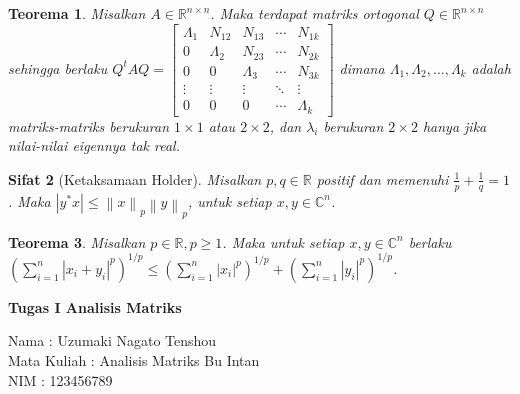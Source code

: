 \documentclass[11pt,a4paper]{article}
\newcommand{\ds}{\displaystyle}
\theoremstyle{plain}
\newtheorem{theorem}{Teorema}[section]
\newtheorem{sifat}[theorem]{Sifat}
\theoremstyle{definition}
\theoremstyle{remark}
\begin{document}
\begin{enumerate}
	\begin{bfseries}
		\begin{theorem}
			Misalkan $A\in \mathbb{R}^{n\times n}$. Maka terdapat matriks ortogonal $Q\in \mathbb{R}^{n\times n}$ sehingga berlaku $Q^{t}AQ = \begin{bmatrix}
			\Lambda_{1} & N_{12} & N_{13} & \cdots & N_{1k} \\
			0 & \Lambda_{2} & N_{23} & \cdots & N_{2k} \\
			0 & 0 & \Lambda_{3} & \cdots & N_{3k} \\
			\vdots & \vdots & \vdots &\ddots & \vdots \\
			0 & 0 & 0 & \cdots & \Lambda_{k}	
			\end{bmatrix}$ dimana $\Lambda_{1},\Lambda_{2},\ldots,\Lambda_{k}$ adalah matriks-matriks berukuran $1\times 1$ atau $2\times 2$, dan $\lambda_{i}$ berukuran $2\times 2$ hanya jika nilai-nilai eigennya tak real.
		\end{theorem}
	\end{bfseries}

	\begin{bfseries}
		\begin{sifat}[Ketaksamaan Holder]
			Misalkan $p,q\in \mathbb{R}$ positif dan memenuhi $\ds \frac{1}{p}+\frac{1}{q}=1$. Maka $\left| y^{\ast}x \right|\leq \left\| x \right\|_{p} \left\| y\right\|_{p}$, untuk setiap $x,y\in \mathbb{C}^{n}$. 
		\end{sifat}
	\end{bfseries}

	\begin{bfseries}
		\begin{theorem}
			Misalkan $p\in \mathbb{R}, p\geq 1$. Maka untuk setiap $x,y\in \mathbb{C}^{n}$ berlaku $\ds \left(\sum_{i=1}^{n} \left| x_{i}+y_{i} \right|^{p} \right)^{1/p} \leq \left(\sum_{i=1}^{n} \left| x_{i} \right|^{p} \right)^{1/p} + \left(\sum_{i=1}^{n} \left| y_{i} \right|^{p} \right)^{1/p}$.
		\end{theorem}
	\end{bfseries}






	\newpage 
	
	\begin{center}
		\textbf{Tugas I Analisis Matriks}
	\end{center}
	
	
	Nama : Uzumaki Nagato Tenshou\\
	Mata Kuliah : Analisis Matriks Bu Intan\\
	NIM : 123456789\\
	

\end{enumerate}
\end{document}

